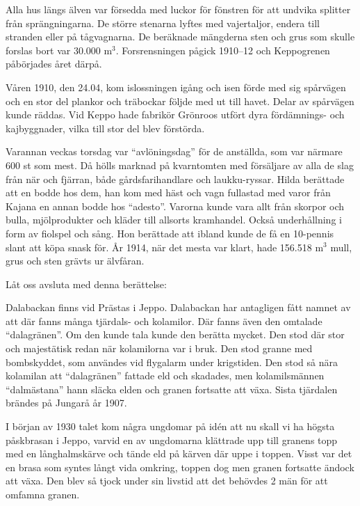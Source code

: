 
Alla hus längs älven var försedda med luckor för fönstren för att undvika splitter från sprängningarna. De större stenarna lyftes med vajertaljor, endera till stranden eller på tågvagnarna. De beräknade mängderna sten och grus som  skulle forslas bort var 30.000 m$^3$. Forsrensningen pågick 1910--12 och Keppogrenen påbörjades året därpå.

Våren 1910, den 24.04, kom islossningen igång och isen förde med sig spårvägen och en stor del plankor och träbockar följde med ut till havet. Delar av spårvägen kunde räddas. Vid Keppo hade fabrikör Grönroos utfört dyra fördämnings- och kajbyggnader, vilka till stor del blev förstörda.

Varannan veckas torsdag var ``avlöningsdag'' för de anställda, som var närmare 600 st som mest. Då hölls marknad på kvarntomten med försäljare av alla de slag från när och fjärran, både gårdsfarihandlare och laukku-ryssar. Hilda berättade att en bodde hos dem, han kom med häst och vagn fullastad med varor från Kajana en annan bodde hos ``adesto''. Varorna kunde vara allt från skorpor och bulla, mjölprodukter och kläder till allsorts kramhandel. Också underhållning i form av fiolspel och sång. Hon berättade att ibland kunde de få en 10-pennis slant att köpa snask för. År 1914, när det mesta var klart, hade 156.518 m$^3$ mull, grus och sten grävts ur älvfåran.




Låt oss avsluta med denna berättelse:


Dalabackan finns vid Prästas i Jeppo. Dalabackan har antagligen fått namnet av att där fanns många tjärdals- och kolamilor. Där fanns även den omtalade ``dalagränen''. Om den kunde tala kunde den berätta mycket.
Den stod där stor och majestätisk redan när kolamilorna var i bruk. Den stod granne med bombskyddet, som användes vid flygalarm under krigstiden. Den stod så nära kolamilan att ``dalagränen'' fattade eld och skadades, men kolamilsmännen ``dalmästana'' hann släcka elden och granen fortsatte att växa. Sista tjärdalen brändes på Jungarå år 1907.

I början av 1930 talet kom några ungdomar på idén att nu skall vi ha högsta påskbrasan i Jeppo, varvid en av ungdomarna klättrade upp till granens topp med en långhalmskärve och tände eld på kärven där uppe i toppen. Visst var det en brasa som syntes långt vida omkring, toppen dog men granen fortsatte ändock att växa. Den blev så tjock under sin livstid att det behövdes 2 män för att omfamna granen.

